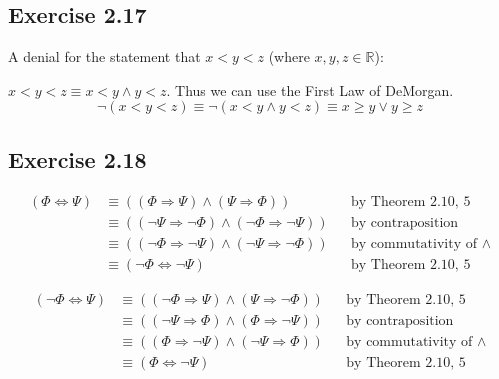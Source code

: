 \documentclass[leqno]{article}
\renewcommand{\geq}{\geqslant}
\renewcommand{\iff}{\Leftrightarrow}
\renewcommand{\implies}{\Rightarrow}
\begin{document}
\subsection*{Exercise 2.17}
A denial for the statement that $x < y < z$ (where $x,y,z \in \mathbb{R}$):

$x < y < z \equiv x < y \land y < z$. Thus we can use the First Law of DeMorgan. 
\[ \neg (x < y < z) \equiv \neg (x < y \land y < z) \equiv x \geq y \lor y \geq z \]

\subsection*{Exercise 2.18}
\begin{equation*}
  \tag*{1.}
  \begin{aligned}
    (\Phi \iff \Psi) & \equiv ((\Phi \implies \Psi) \land (\Psi \implies \Phi))
                       && \text{by Theorem 2.10, 5} \\
                     & \equiv ((\neg \Psi \implies \neg \Phi) \land (\neg \Phi \implies \neg \Psi))
                       && \text{by contraposition} \\
                     & \equiv ((\neg \Phi \implies \neg \Psi) \land (\neg \Psi \implies \neg \Phi))
                       && \text{by commutativity of } \land \\
                     & \equiv (\neg \Phi \iff \neg \Psi)
                       && \text{by Theorem 2.10, 5}
  \end{aligned}
\end{equation*}

\begin{equation*}
  \tag*{2.}
  \begin{aligned}
    (\neg \Phi \iff \Psi) & \equiv ((\neg \Phi \implies \Psi) \land (\Psi \implies \neg \Phi))
                            && \text{by Theorem 2.10, 5} \\
                          & \equiv ((\neg \Psi \implies \Phi) \land (\Phi \implies \neg \Psi))
                            && \text{by contraposition} \\
                          & \equiv ((\Phi \implies \neg \Psi) \land (\neg \Psi \implies \Phi))
                            && \text{by commutativity of } \land \\
                          & \equiv (\Phi \iff \neg \Psi)
                            && \text{by Theorem 2.10, 5}
  \end{aligned}
\end{equation*}
\end{document}
